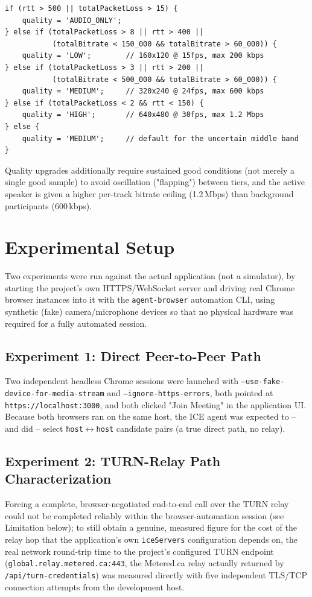 \documentclass[12pt,a4paper]{report}
\begin{document}
\begin{lstlisting}[caption={Adaptive quality decision logic (public/script.js, verbatim thresholds)}]
if (rtt > 500 || totalPacketLoss > 15) {
    quality = 'AUDIO_ONLY';
} else if (totalPacketLoss > 8 || rtt > 400 ||
           (totalBitrate < 150_000 && totalBitrate > 60_000)) {
    quality = 'LOW';        // 160x120 @ 15fps, max 200 kbps
} else if (totalPacketLoss > 3 || rtt > 200 ||
           (totalBitrate < 500_000 && totalBitrate > 60_000)) {
    quality = 'MEDIUM';     // 320x240 @ 24fps, max 600 kbps
} else if (totalPacketLoss < 2 && rtt < 150) {
    quality = 'HIGH';       // 640x480 @ 30fps, max 1.2 Mbps
} else {
    quality = 'MEDIUM';     // default for the uncertain middle band
}
\end{lstlisting}

Quality upgrades additionally require sustained good conditions (not merely a single good
sample) to avoid oscillation ("flapping") between tiers, and the active speaker is given a
higher per-track bitrate ceiling (1.2\,Mbps) than background participants (600\,kbps).

\chapter{Experimental Setup}

Two experiments were run against the actual application (not a simulator), by starting the
project's own HTTPS/WebSocket server and driving real Chrome browser instances into it with
the \texttt{agent-browser} automation CLI, using synthetic (fake) camera/microphone devices
so that no physical hardware was required for a fully automated session.

\section{Experiment 1: Direct Peer-to-Peer Path}
Two independent headless Chrome sessions were launched with
\texttt{--use-fake-device-for-media-stream} and \texttt{--ignore-https-errors}, both pointed
at \texttt{https://localhost:3000}, and both clicked "Join Meeting" in the application UI.
Because both browsers ran on the same host, the ICE agent was expected to -- and did --
select \texttt{host}$\leftrightarrow$\texttt{host} candidate pairs (a true direct path, no
relay).

\section{Experiment 2: TURN-Relay Path Characterization}
Forcing a complete, browser-negotiated end-to-end call over the TURN relay could not be
completed reliably within the browser-automation session (see Limitation below); to still
obtain a genuine, measured figure for the cost of the relay hop that the application's own
\texttt{iceServers} configuration depends on, the real network round-trip time to the
project's configured TURN endpoint (\texttt{global.relay.metered.ca:443}, the Metered.ca
relay actually returned by \texttt{/api/turn-credentials}) was measured directly with five
independent TLS/TCP connection attempts from the development host.
\end{document}

